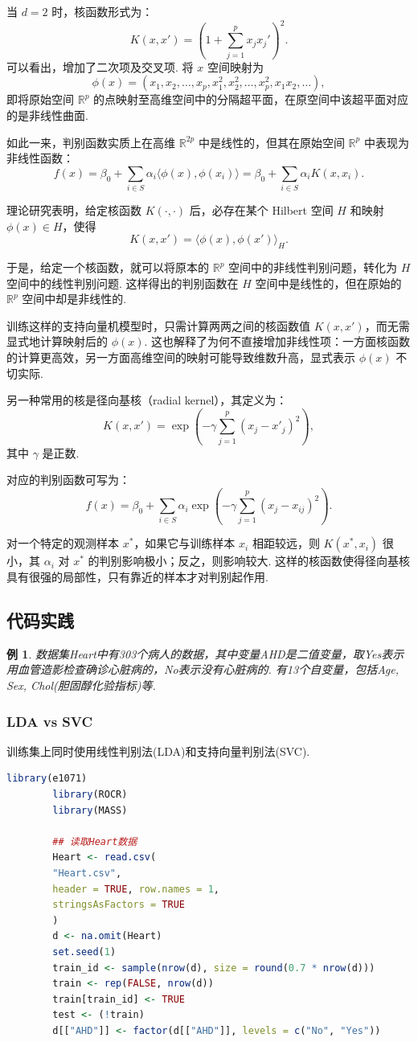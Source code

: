 \documentclass[12pt, a4paper, oneside]{ctexart}
\newtheorem{example}[theorem]{例}
\begin{document}
	当 \(d = 2\) 时，核函数形式为：
	\[
	K(x, x') = \left(1 + \sum_{j=1}^{p} x_j x_j' \right)^2.
	\]
	可以看出，增加了二次项及交叉项. 将 \(x\) 空间映射为
	\[
	\phi(x) = (x_1, x_2, \ldots, x_p, x_1^2, x_2^2, \ldots, x_p^2, x_1 x_2, \ldots),
	\]
	即将原始空间 \(\mathbb{R}^p\) 的点映射至高维空间中的分隔超平面，在原空间中该超平面对应的是非线性曲面.
	
	如此一来，判别函数实质上在高维 \(\mathbb{R}^{2p}\) 中是线性的，但其在原始空间 \(\mathbb{R}^p\) 中表现为非线性函数：
	\[
	f(x) = \beta_0 + \sum_{i \in S} \alpha_i \langle \phi(x), \phi(x_i) \rangle = \beta_0 + \sum_{i \in S} \alpha_i K(x, x_i).
	\]
	
	理论研究表明，给定核函数 \(K(\cdot, \cdot)\) 后，必存在某个 Hilbert 空间 \(H\) 和映射 \(\phi(x) \in H\)，使得
	\[
	K(x, x') = \langle \phi(x), \phi(x') \rangle_H.
	\]
	
	于是，给定一个核函数，就可以将原本的 \(\mathbb{R}^p\) 空间中的非线性判别问题，转化为 \(H\) 空间中的线性判别问题. 这样得出的判别函数在 \(H\) 空间中是线性的，但在原始的 \(\mathbb{R}^p\) 空间中却是非线性的.
	
	训练这样的支持向量机模型时，只需计算两两之间的核函数值 \(K(x, x')\)，而无需显式地计算映射后的 \(\phi(x)\). 这也解释了为何不直接增加非线性项：一方面核函数的计算更高效，另一方面高维空间的映射可能导致维数升高，显式表示 \(\phi(x)\) 不切实际.
	
	
	另一种常用的核是径向基核（radial kernel），其定义为：
	\[
	K(x, x') = \exp \left( -\gamma \sum_{j=1}^{p} (x_j - x'_j)^2 \right),
	\]
	其中 \(\gamma\) 是正数. 
	
	对应的判别函数可写为：
	\[
	f(x) = \beta_0 + \sum_{i \in S} \alpha_i \exp \left( -\gamma \sum_{j=1}^{p} (x_j - x_{ij})^2 \right).
	\]
	
	对一个特定的观测样本 \(x^*\)，如果它与训练样本 \(x_i\) 相距较远，则 \(K(x^*, x_i)\) 很小，其 \(\alpha_i\) 对 \(x^*\) 的判别影响极小；反之，则影响较大. 这样的核函数使得径向基核具有很强的局部性，只有靠近的样本才对判别起作用.
	
	\subsection{代码实践}
	\begin{example}
		数据集Heart中有303个病人的数据，其中变量AHD是二值变量，取Yes表示用血管造影检查确诊心脏病的，No表示没有心脏病的. 有13个自变量，包括Age, Sex, Chol(胆固醇化验指标)等.
	\end{example}
	\subsubsection{LDA vs SVC}
	训练集上同时使用线性判别法(LDA)和支持向量判别法(SVC).
	\begin{lstlisting}[language=R]
		library(e1071)
		library(ROCR)
		library(MASS)
		
		## 读取Heart数据
		Heart <- read.csv(
		"Heart.csv",
		header = TRUE, row.names = 1,
		stringsAsFactors = TRUE
		)
		d <- na.omit(Heart)
		set.seed(1)
		train_id <- sample(nrow(d), size = round(0.7 * nrow(d)))
		train <- rep(FALSE, nrow(d))
		train[train_id] <- TRUE
		test <- (!train)
		d[["AHD"]] <- factor(d[["AHD"]], levels = c("No", "Yes"))
	\end{lstlisting}
	
\end{document}
